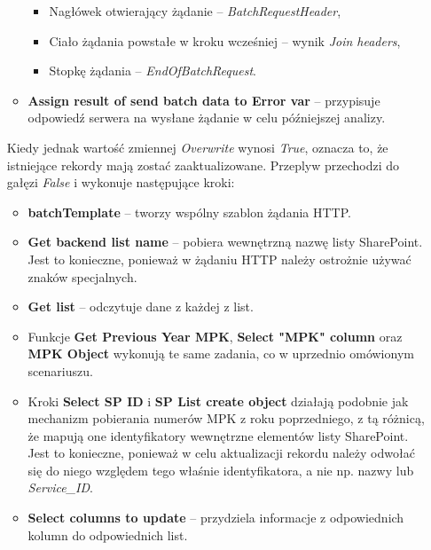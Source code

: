 \begin{enumerate}
\begin{itemize}
                    \begin{itemize}
                        \item Nagłówek otwierający żądanie -- \emph{BatchRequestHeader},
                        \item Ciało żądania powstałe w kroku wcześniej -- wynik \emph{Join headers},
                        \item Stopkę żądania -- \emph{EndOfBatchRequest}.
                    \end{itemize}
              \item \textbf{Assign result of send batch data to Error var} -- przypisuje odpowiedź serwera na wysłane żądanie w celu późniejszej analizy.
          \end{itemize}

          Kiedy jednak wartość zmiennej \emph{Overwrite} wynosi \emph{True}, oznacza to, że istniejące rekordy mają zostać zaaktualizowane. Przeplyw przechodzi do gałęzi \emph{False} i wykonuje następujące kroki:
          \begin{itemize}
              \item \textbf{batchTemplate} -- tworzy wspólny szablon żądania HTTP.
              \item \textbf{Get backend list name} -- pobiera wewnętrzną nazwę listy SharePoint. Jest to konieczne, ponieważ w żądaniu HTTP należy ostrożnie używać znaków specjalnych.
              \item \textbf{Get list} -- odczytuje dane z każdej z list.
          \end{itemize}
          \begin{itemize}[label=\textasteriskcentered]
              \item Funkcje \textbf{Get Previous Year MPK}, \textbf{Select "MPK" column} oraz \textbf{MPK Object} wykonują te same zadania, co w uprzednio omówionym scenariuszu.
          \end{itemize}
          \begin{itemize}
              \item Kroki \textbf{Select SP ID} i \textbf{SP List create object} działają podobnie jak mechanizm pobierania numerów MPK z roku poprzedniego, z tą różnicą, że mapują one identyfikatory wewnętrzne elementów listy SharePoint. Jest to konieczne, ponieważ w celu aktualizacji rekordu należy odwołać się do niego względem tego właśnie identyfikatora, a nie np. nazwy lub \emph{Service\_ID}.
              \item \textbf{Select columns to update} -- przydziela informacje z odpowiednich kolumn do odpowiednich list.

\end{itemize}
\end{enumerate}
